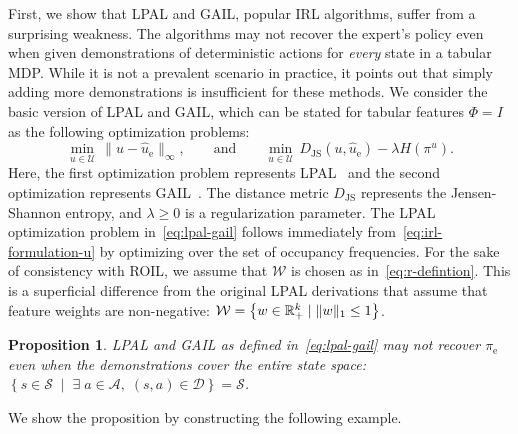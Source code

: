 \documentclass[10pt]{article}
\renewcommand{\cite}{\citep}
\theoremstyle{plain}
\newtheorem{proposition}{Proposition}
\theoremstyle{remark}
\begin{document}
First, we show that LPAL and GAIL, popular IRL algorithms, suffer from a surprising weakness. The algorithms may not recover the expert's policy even when given demonstrations of deterministic actions for \emph{every} state in a tabular MDP. While it is not a prevalent scenario in practice, it points out that simply adding more demonstrations is insufficient for these methods. We consider the basic version of LPAL and GAIL, which can be stated for tabular features $\Phi = I$ as the following optimization problems:
\begin{equation} \label{eq:lpal-gail}
  \min_{u\in \mathcal{U}}\, \| u - \hat{u}_{\mathrm{e}} \|_{\infty},
  \qquad
  \text{and}
  \qquad
  \min_{u\in \mathcal{U}} \, D_{\mathrm{JS}}(u, \hat{u}_{\mathrm{e}}) - \lambda H(\pi^{u}).
\end{equation}
Here, the first optimization problem represents LPAL~\cite{Syed2008} and the second optimization represents GAIL~\cite[eq.~(15)]{Ho2016}. The distance metric $D_{\mathrm{JS}}$ represents the Jensen-Shannon entropy, and $\lambda \ge 0$ is a regularization parameter. The LPAL optimization problem in~\eqref{eq:lpal-gail} follows immediately from~\eqref{eq:irl-formulation-u} by optimizing over the set of occupancy frequencies. For the sake of consistency with ROIL, we assume that $\mathcal{W}$ is chosen as in~\eqref{eq:r-defintion}. This is a superficial difference from the original LPAL derivations that assume that feature weights are non-negative: $\mathcal{W} = \left\{ w\in \mathbb{R}^k_+ \mid \| w\|_1 \le  1  \right\}$.
\begin{proposition}
LPAL and GAIL as defined in~\eqref{eq:lpal-gail} may not recover $\pi_{\mathrm{e}}$ even when the demonstrations cover the entire state space: $ \left\{ s\in \mathcal{S} \; \mid \; \exists\; a\in \mathcal{A}, \; (s,a) \in \mathcal{D} \right\} = \mathcal{S}$. 
\end{proposition}
We show the proposition by constructing the following example. 
\end{document}
